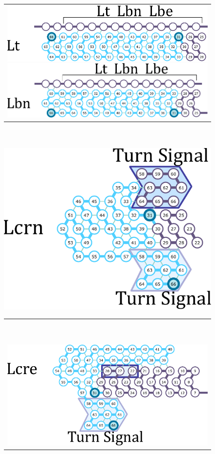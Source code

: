 \documentclass[runningheads]{llncs}
\begin{document}
\begin{figure}[tb]
\begin{tabular}{c}
 \begin{minipage}{0.5\linewidth}
  \centering
   \includegraphics[width=0.8\linewidth]{fig/svg/Lt_3.pdf}
 \end{minipage}
 
 \begin{minipage}{0.5\linewidth}
  \centering
   \includegraphics[width=0.8\linewidth]{fig/svg/Lbc_3.pdf}

 \end{minipage}
 \end{tabular}

\ \\
\ \\
  \centering
   \includegraphics[width=0.4\linewidth]{fig/svg/Ltrc_3.pdf}


\begin{tabular}{c}
\ \\
\ \\
 \begin{minipage}{0.5\linewidth}
  \centering
   \includegraphics[width=0.8\linewidth]{fig/svg/Ltre_3.pdf}
 \end{minipage}
 

\end{tabular}
\end{figure}
\end{document}
